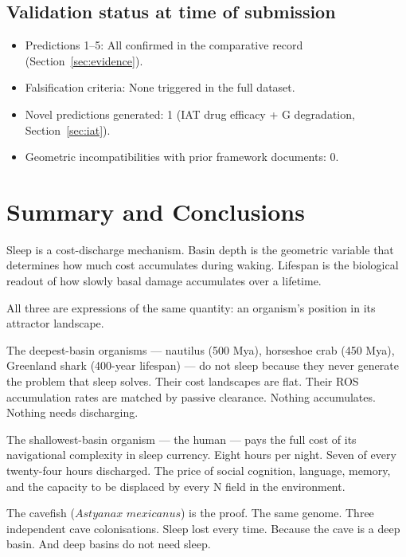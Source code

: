 \documentclass[12pt, a4paper]{article}
\begin{document}
\subsection{Validation status at time of submission}

\begin{itemize}
    \item Predictions 1--5: All confirmed in the
          comparative record (Section~\ref{sec:evidence}).
    \item Falsification criteria: None triggered in the
          full dataset.
    \item Novel predictions generated: 1 (IAT drug efficacy
          + G degradation, Section~\ref{sec:iat}).
    \item Geometric incompatibilities with prior framework
          documents: 0.
\end{itemize}

\section{Summary and Conclusions}
\label{sec:conclusions}

Sleep is a cost-discharge mechanism. Basin depth is the
geometric variable that determines how much cost accumulates
during waking. Lifespan is the biological readout of how
slowly basal damage accumulates over a lifetime.

All three are expressions of the same quantity: an
organism's position in its attractor landscape.

The deepest-basin organisms --- nautilus (500 Mya), horseshoe
crab (450 Mya), Greenland shark (400-year lifespan) --- do not
sleep because they never generate the problem that sleep
solves. Their cost landscapes are flat. Their ROS
accumulation rates are matched by passive clearance. Nothing
accumulates. Nothing needs discharging.

The shallowest-basin organism --- the human --- pays the full
cost of its navigational complexity in sleep currency.
Eight hours per night. Seven of every twenty-four hours
discharged. The price of social cognition, language,
memory, and the capacity to be displaced by every N field
in the environment.

The cavefish ($\textit{Astyanax mexicanus}$) is the proof.
The same genome. Three independent cave colonisations.
Sleep lost every time. Because the cave is a deep basin.
And deep basins do not need sleep.
\end{document}
